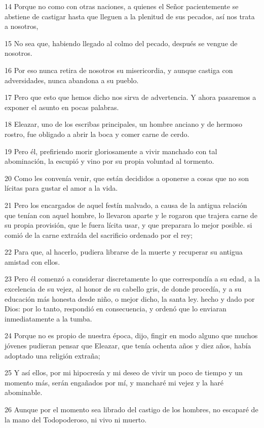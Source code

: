 \par 14 Porque no como con otras naciones, a quienes el Señor pacientemente se abstiene de castigar hasta que lleguen a la plenitud de sus pecados, así nos trata a nosotros,
\par 15 No sea que, habiendo llegado al colmo del pecado, después se vengue de nosotros.
\par 16 Por eso nunca retira de nosotros su misericordia, y aunque castiga con adversidades, nunca abandona a su pueblo.
\par 17 Pero que esto que hemos dicho nos sirva de advertencia. Y ahora pasaremos a exponer el asunto en pocas palabras.
\par 18 Eleazar, uno de los escribas principales, un hombre anciano y de hermoso rostro, fue obligado a abrir la boca y comer carne de cerdo.
\par 19 Pero él, prefiriendo morir gloriosamente a vivir manchado con tal abominación, la escupió y vino por su propia voluntad al tormento.
\par 20 Como les convenía venir, que están decididos a oponerse a cosas que no son lícitas para gustar el amor a la vida.
\par 21 Pero los encargados de aquel festín malvado, a causa de la antigua relación que tenían con aquel hombre, lo llevaron aparte y le rogaron que trajera carne de su propia provisión, que le fuera lícita usar, y que preparara lo mejor posible. si comió de la carne extraída del sacrificio ordenado por el rey;
\par 22 Para que, al hacerlo, pudiera librarse de la muerte y recuperar su antigua amistad con ellos.
\par 23 Pero él comenzó a considerar discretamente lo que correspondía a su edad, a la excelencia de su vejez, al honor de su cabello gris, de donde procedía, y a su educación más honesta desde niño, o mejor dicho, la santa ley. hecho y dado por Dios: por lo tanto, respondió en consecuencia, y ordenó que lo enviaran inmediatamente a la tumba.
\par 24 Porque no es propio de nuestra época, dijo, fingir en modo alguno que muchos jóvenes pudieran pensar que Eleazar, que tenía ochenta años y diez años, había adoptado una religión extraña;
\par 25 Y así ellos, por mi hipocresía y mi deseo de vivir un poco de tiempo y un momento más, serán engañados por mí, y mancharé mi vejez y la haré abominable.
\par 26 Aunque por el momento sea librado del castigo de los hombres, no escaparé de la mano del Todopoderoso, ni vivo ni muerto.
